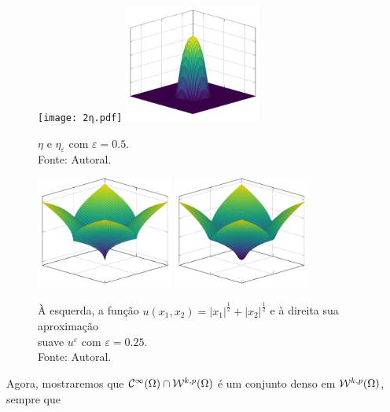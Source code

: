 \begin{ex}
    \begin{figure}
        \centering
        \texttt{[image: 2η.pdf]}
        \hspace{10mm}
        \includegraphics[width=0.4\textwidth]{2ηε.pdf}
        \caption{$\eta$ e $\eta_\varepsilon$ com $\varepsilon = 0.5$.\\Fonte: Autoral.}
        \label{fig:eta-R2}
    \end{figure}

    \begin{figure}
        \centering
        \includegraphics[width=0.4\textwidth]{u.pdf}
        \hspace{10mm}
        \includegraphics[width=0.4\textwidth]{uε2.pdf}
        \caption{À esquerda, a função $u(x_1,x_2) = |x_1|^{\frac{1}{2}} + |x_2|^{\frac{1}{2}}$ e à direita sua aproximação\\suave $u^\varepsilon$ com $\varepsilon = 0.25$.\\Fonte: Autoral.}
        \label{fig:aproximacao-suave-R2}
    \end{figure}
\end{ex}

Agora, mostraremos que $\mathcal{C}^{\infty}(\Omega) \cap \mathcal{W}^{k,p}(\Omega)$ é um conjunto denso em $\mathcal{W}^{k,p}(\Omega)$, sempre que 

